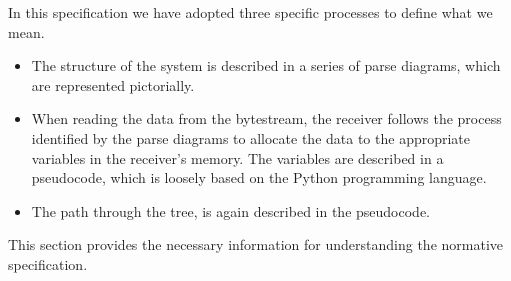 In this specification we have adopted three specific processes to define
what we mean.

\begin{itemize}
    \item The structure of the system is described in a series of parse
    diagrams, which are represented pictorially.

    \item When reading the data from the bytestream, the receiver
    follows the process identified by the parse diagrams to allocate the
    data to the appropriate variables in the receiver's memory. The
    variables are described in a pseudocode, which is loosely based on
    the Python programming language.

	\item The path through the tree, is again described in the pseudocode.
\end{itemize}

This section provides the necessary information for understanding the
normative specification.

